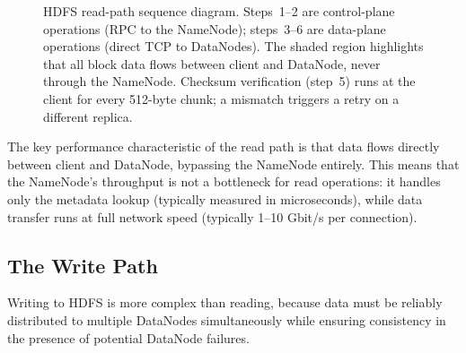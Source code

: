 \begin{figure}[h!t]
\caption{HDFS read-path sequence diagram. Steps~1--2 are control-plane
         operations (RPC to the NameNode); steps~3--6 are data-plane
         operations (direct TCP to DataNodes). The shaded region highlights
         that all block data flows between client and DataNode, never
         through the NameNode. Checksum verification (step~5) runs at the
         client for every 512-byte chunk; a mismatch triggers a retry on
         a different replica.}
\label{fig:hdfs-read}
\end{figure}

The key performance characteristic of the read path is that data flows
directly between client and DataNode, bypassing the NameNode entirely.
This means that the NameNode's throughput is not a bottleneck for read
operations: it handles only the metadata lookup (typically measured in
microseconds), while data transfer runs at full network speed
(typically 1--10 Gbit/s per connection).

\subsection{The Write Path}
\label{subsec:write-path}

Writing to HDFS is more complex than reading, because data must be
reliably distributed to multiple DataNodes simultaneously while
ensuring consistency in the presence of potential DataNode failures.

